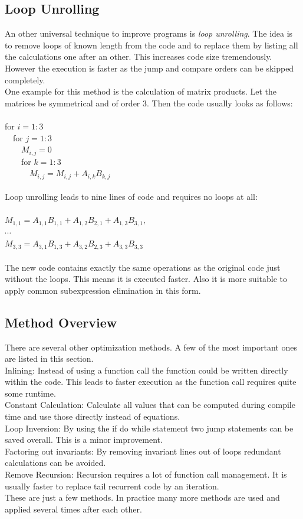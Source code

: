 \documentclass[12pt, a4paper]{article}
\begin{document}
\subsection{Loop Unrolling}
An other universal technique to improve programs is \textit{loop unrolling}. The idea is to remove loops of known length from the code and to replace them by listing all the calculations one after an other. This increases code size tremendously. However the execution is faster as the jump and compare orders can be skipped completely. \\
One example for this method is the calculation of matrix products. Let the matrices be symmetrical and of order $3$. Then the code usually looks as follows:\\ \ \\
for $i = 1:3$ \\
  \ \ for $j = 1:3$\\
  \ \ \ \ $M_{i,j} = 0$\\
  \ \ \ \ for $k = 1:3$\\
  \ \ \ \ \ \ $M_{i,j} = M_{i,j} + A_{i,k} B_{k,j}$\\ \ \\

Loop unrolling leads to nine lines of code and requires no loops at all: \\ \ \\
  $M_{1,1} = A_{1,1}B_{1,1}+A_{1,2}B_{2,1}+A_{1,3}B_{3,1}, $\\
  $\cdots$ \\
  $M_{3,3} = A_{3,1}B_{1,3}+A_{3,2}B_{2,3}+A_{3,3}B_{3,3}$ \\ \ \\
  The new code contains exactly the same operations as the original code just without the loops. This means it is executed faster. Also it is more suitable to apply common subexpression elimination in this form.
\subsection{Method Overview}
There are several other optimization methods. A few of the most important ones are listed in this section. \\
Inlining: Instead of using a function call the function could be written directly within the code. This leads to faster execution as the function call requires quite some runtime. \\
Constant Calculation: Calculate all values that can be computed during compile time and use those directly instead of equations. \\
Loop Inversion: By using the if do while statement two jump statements can be saved overall. This is a minor improvement. \\
Factoring out invariants: By removing invariant lines out of loops redundant calculations can be avoided. \\
Remove Recursion: Recursion requires a lot of function call management. It is usually faster to replace tail recurrent code by an iteration. \\
These are just a few methods. In practice many more methods are used and applied several times after each other.
\end{document}
